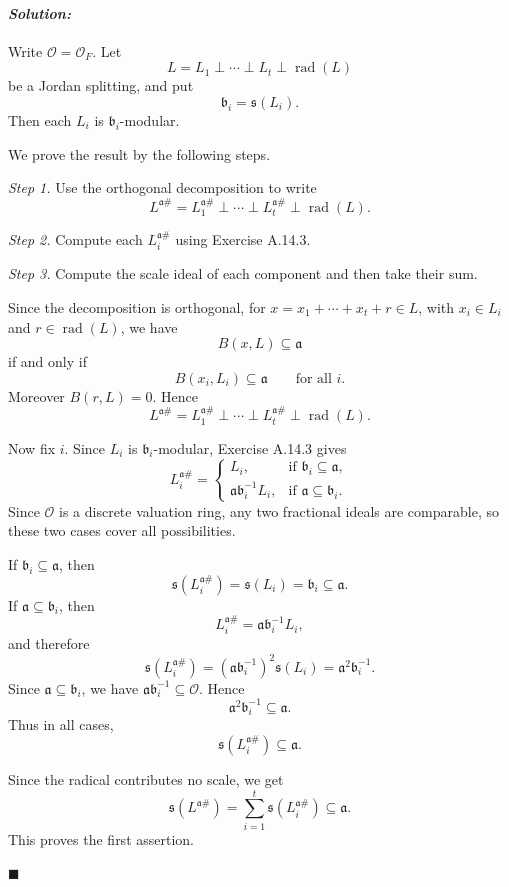 \documentclass[12pt, a4paper]{article}
\newenvironment{solution}
  {\paragraph{\textit{Solution:}}\par\medskip}
  {\hfill$\blacksquare$\vspace{0.1cm}}
\begin{document}
\begin{solution}
Write \(\mathcal O=\mathcal O_F\). Let
\[
L=L_1\perp\cdots\perp L_t\perp \operatorname{rad}(L)
\]
be a Jordan splitting, and put
\[
\mathfrak b_i=\mathfrak s(L_i).
\]
Then each \(L_i\) is \(\mathfrak b_i\)-modular.

We prove the result by the following steps.

\emph{Step 1.} Use the orthogonal decomposition to write
\[
L^{\mathfrak a\#}
=
L_1^{\mathfrak a\#}\perp\cdots\perp L_t^{\mathfrak a\#}
\perp \operatorname{rad}(L).
\]

\emph{Step 2.} Compute each \(L_i^{\mathfrak a\#}\) using Exercise A.14.3.

\emph{Step 3.} Compute the scale ideal of each component and then take their
sum.

Since the decomposition is orthogonal, for
\(x=x_1+\cdots+x_t+r\in L\), with \(x_i\in L_i\) and
\(r\in \operatorname{rad}(L)\), we have
\[
B(x,L)\subseteq \mathfrak a
\]
if and only if
\[
B(x_i,L_i)\subseteq \mathfrak a
\qquad
\text{for all } i.
\]
Moreover \(B(r,L)=0\). Hence
\[
L^{\mathfrak a\#}
=
L_1^{\mathfrak a\#}\perp\cdots\perp L_t^{\mathfrak a\#}
\perp \operatorname{rad}(L).
\]

Now fix \(i\). Since \(L_i\) is \(\mathfrak b_i\)-modular, Exercise A.14.3
gives
\[
L_i^{\mathfrak a\#}
=
\begin{cases}
L_i, & \text{if } \mathfrak b_i\subseteq \mathfrak a,\\
\mathfrak a\mathfrak b_i^{-1}L_i, & \text{if } \mathfrak a\subseteq \mathfrak b_i.
\end{cases}
\]
Since \(\mathcal O\) is a discrete valuation ring, any two fractional ideals
are comparable, so these two cases cover all possibilities.

If \(\mathfrak b_i\subseteq \mathfrak a\), then
\[
\mathfrak s(L_i^{\mathfrak a\#})
=
\mathfrak s(L_i)
=
\mathfrak b_i
\subseteq \mathfrak a.
\]
If \(\mathfrak a\subseteq \mathfrak b_i\), then
\[
L_i^{\mathfrak a\#}
=
\mathfrak a\mathfrak b_i^{-1}L_i,
\]
and therefore
\[
\mathfrak s(L_i^{\mathfrak a\#})
=
(\mathfrak a\mathfrak b_i^{-1})^2\mathfrak s(L_i)
=
\mathfrak a^2\mathfrak b_i^{-1}.
\]
Since \(\mathfrak a\subseteq \mathfrak b_i\), we have
\(\mathfrak a\mathfrak b_i^{-1}\subseteq \mathcal O\). Hence
\[
\mathfrak a^2\mathfrak b_i^{-1}
\subseteq
\mathfrak a.
\]
Thus in all cases,
\[
\mathfrak s(L_i^{\mathfrak a\#})\subseteq \mathfrak a.
\]

Since the radical contributes no scale, we get
\[
\mathfrak s(L^{\mathfrak a\#})
=
\sum_{i=1}^t \mathfrak s(L_i^{\mathfrak a\#})
\subseteq \mathfrak a.
\]
This proves the first assertion.


\end{solution}
\end{document}

